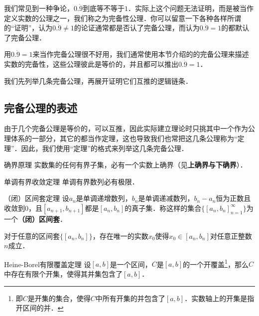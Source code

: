 



我们常见到一种争论，$0.\dot{9}$到底等不等于$1$．实际上这个问题无法证明，而是被当作定义实数的公理之一，我们称之为完备性公理．你可以留意一下各种各样所谓的“证明”，认为$0.\dot{9}\neq 1$的论证通常都是否认了完备公理，而认为$0.\dot{9}=1$的都默认了完备公理．

用$0.\dot{9}=1$来当作完备公理很不好用，我们通常使用本节介绍的的完备公理来描述实数的完备性，这些公理彼此是等价的，并且都可以推出$0.\dot{9}=1$．

我们先列举几条完备公理，再展开证明它们互推的逻辑链条．

\subsection{完备公理的表述}

由于几个完备公理是等价的，可以互推，因此实际建立理论时只挑其中一个作为公理体系的一部分，其它的都当作定理，这也导致我们也常把这几条公理称为“定理”．因此，我们使用“定理”的格式来列举这几条完备公理．

\begin{theorem}{确界原理}\label{RCompl_the1}
实数集的任何有界子集，必有一个实数上确界（见\textbf{上确界与下确界}）．
\end{theorem}

\begin{theorem}{单调有界收敛定理}\label{RCompl_the2}
单调有界数列必有极限．
\end{theorem}

\begin{theorem}{（闭）区间套定理}\label{RCompl_the3}
设$a_n$是单调递增数列，$b_n$是单调递减数列，$b_n-a_n$恒为正数且收敛到$0$，且$[a_{n+1}, b_{n+1}]$都是$[a_n, b_n]$的真子集．称这样的集合$\{[a_n, b_n]_{n=1}^\infty\}$为一个\textbf{（闭）区间套}．

对于任意的区间套$\{[a_n, b_n]\}$，存在唯一的实数$x_0$使得$x_0\in [a_n, b_n]$对任意正整数$n$成立．
\end{theorem}

\begin{theorem}{Heine-Borel有限覆盖定理}\label{RCompl_the4}
设$[a, b]$是一个区间，$C$是$[a, b]$的一个开覆盖\footnote{即$C$是开集的集合，使得$C$中所有开集的并包含了$[a, b]$．实数轴上的开集是指开区间的并．}，那么$C$中存在有限个开集，使得其并集包含了$[a, b]$．
\end{theorem}

